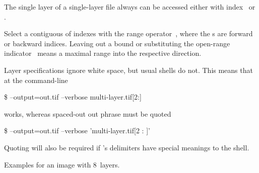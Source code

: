 The single layer of a single-layer file always can be accessed either
with index~ or .

Select a contiguous  of indexes with the range
operator~, where the
\/s are forward or backward indices.  Leaving out
a bound or substituting the open-range
indicator~ means a
maximal range into the respective direction.

Layer specifications ignore white space, but usual shells do not.
This means that at the command-line
\begin{terminal}
  \$ \app{} --output=out.tif --verbose multi-layer.tif[2:]
\end{terminal}
works, whereas spaced-out out phrase 
must be quoted
\begin{terminal}
  \$ \app{} --output=out.tif --verbose 'multi-layer.tif[2 : ]'
\end{terminal}
Quoting will also be required if \App's delimiters have special
meanings to the shell.

Examples for an image with 8~layers.

